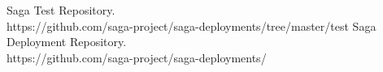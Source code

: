 \documentclass[]{paper}
\begin{document}

\begin{thebibliography}{99}
Saga Test Repository.\\ https://github.com/saga-project/saga-deployments/tree/master/test
Saga Deployment Repository.\\ https://github.com/saga-project/saga-deployments/


\end{thebibliography}
\end{document}
